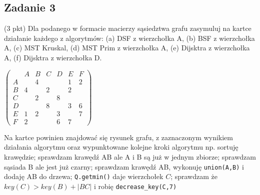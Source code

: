 \documentclass{article}
\begin{document}
\subsection*{Zadanie 3}
(3 pkt) Dla podanego w formacie macierzy sąsiedztwa grafu zasymuluj na kartce działanie
każdego z algorytmów: (a) DSF z wierzchołka A, (b) BSF z wierzchołka A, (c) MST
Kruskal, (d) MST Prim z wierzchołka A, (e) Dijsktra z wierzchołka A, (f) Dijsktra z
wierzchołka D.
\begin{center}$
        \begin{pmatrix}
              & A & B & C & D & E & F \\
            A &   & 4 &   &   & 1 & 2 \\
            B & 4 &   & 2 &   & 2 &   \\
            C &   & 2 &   & 8 &   &   \\
            D &   &   & 8 &   & 3 & 6 \\
            E & 1 & 2 &   & 3 &   & 7 \\
            F & 2 &   &   & 6 & 7 &
        \end{pmatrix}$
\end{center}
Na kartce powinien znajdować się rysunek grafu, z zaznaczonym wynikiem działania algorytmu
oraz wypunktowane kolejne kroki algorytmu np. sortuję krawędzie; sprawdzam
krawędź AB ale A i B są już w jednym zbiorze; sprawdzam sąsiada B ale jest już czarny;
sprawdzam krawędź AB, wykonuję \verb|union(A,B)| i dodaję AB do drzewa; \verb|Q.getmin()|
daje wierzchołek $C$; sprawdzam że $key(C) > key(B) + |BC|$ i robię \verb|decrease_key(C,7)|
\begin{center}
\end{center}
\pagebreak
\end{document}
